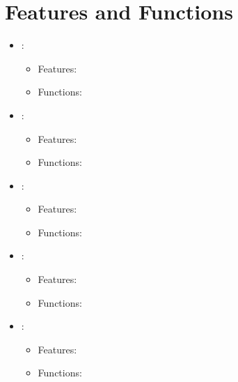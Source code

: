 \section{Features and Functions}
\begin{itemize}
  \item {}:
  \begin{itemize}
    \item Features:
    \item Functions:
  \end{itemize}
  \item {}:
  \begin{itemize}
    \item Features:
    \item Functions:
  \end{itemize}
  \item {}:
  \begin{itemize}
    \item Features:
    \item Functions:
  \end{itemize}
  \item {}:
  \begin{itemize}
    \item Features:
    \item Functions:
  \end{itemize}
  \item {}:
  \begin{itemize}
    \item Features:
    \item Functions:
  \end{itemize}
\end{itemize}